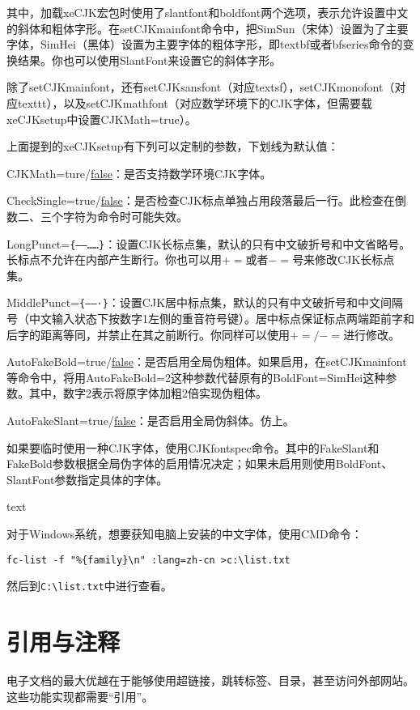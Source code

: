{其中，加载xeCJK宏包时使用了slantfont和boldfont两个选项，表示允许设置中文的斜体和粗体字形。在setCJKmainfont命令中，把SimSun（宋体）设置为了主要字体，SimHei（黑体）设置为主要字体的粗体字形，即textbf或者bfseries命令的变换结果。你也可以使用SlantFont来设置它的斜体字形。

除了setCJKmainfont，还有setCJKsansfont（对应textsf），setCJKmonofont（对应texttt），以及setCJKmathfont（对应数学环境下的CJK字体，但需要载xeCJKsetup中设置CJKMath=true）。

上面提到的xeCJKsetup有下列可以定制的参数，下划线为默认值：
\begin{feai}
\item CJKMath=ture/\uline{false}：是否支持数学环境CJK字体。
\item CheckSingle=true/\uline{false}：是否检查CJK标点单独占用段落最后一行。此检查在倒数二、三个字符为命令时可能失效。
\item LongPunct=\verb|{——……}|：设置CJK长标点集，默认的只有中文破折号和中文省略号。长标点不允许在内部产生断行。你也可以用$+=$或者$-=$号来修改CJK长标点集。
\item MiddlePunct=\verb|{——·}|：设置CJK居中标点集，默认的只有中文破折号和中文间隔号（中文输入状态下按数字1左侧的重音符号键）。居中标点保证标点两端距前字和后字的距离等同，并禁止在其之前断行。你同样可以使用$+=/-=$进行修改。
\item AutoFakeBold=true/\uline{false}：是否启用全局伪粗体。如果启用，在setCJKmainfont等命令中，将用AutoFakeBold=2这种参数代替原有的BoldFont=SimHei这种参数。其中，数字2表示将原字体加粗2倍实现伪粗体。
\item AutoFakeSlant=true/\uline{false}：是否启用全局伪斜体。仿上。
\end{feai}

如果要临时使用一种CJK字体，使用CJKfontspec命令。其中的FakeSlant和FakeBold参数根据全局伪字体的启用情况决定；如果未启用则使用BoldFont、SlantFont参数指定具体的字体。
\begin{latex}{}
{ text}
\end{latex}

对于Windows系统，想要获知电脑上安装的中文字体，使用CMD命令：
\begin{verbatim}
fc-list -f "%{family}\n" :lang=zh-cn >c:\list.txt
\end{verbatim}

然后到\verb|C:\list.txt|中进行查看。

\section{引用与注释}
电子文档的最大优越在于能够使用超链接，跳转标签、目录，甚至访问外部网站。这些功能实现都需要“引用”。
}
